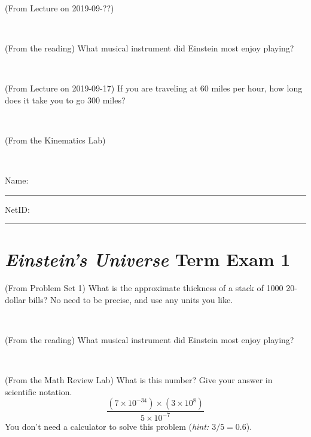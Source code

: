 \documentclass[12pt, letterpaper]{article}
\begin{document}
\vfill ~


\clearpage


\begin{problem} (From Lecture on 2019-09-??)
\end{problem}


\vfill ~

\begin{problem} (From the reading)
What musical instrument did Einstein most enjoy playing?
\end{problem}


\vfill ~

\begin{problem} (From Lecture on 2019-09-17)
If you are traveling at 60 miles per hour, how long does
it take you to go 300 miles?
\end{problem}


\vfill ~

\begin{problem} (From the Kinematics Lab)

\end{problem}


\vfill ~


\cleardoublepage



\noindent
Name: \rule[-1ex]{0.60\textwidth}{0.1pt}
NetID: \rule[-1ex]{0.20\textwidth}{0.1pt}

\section*{\textsl{Einstein's Universe} Term Exam 1}
\setcounter{problem}{1}


\begin{problem} (From Problem Set 1)
What is the approximate thickness of a stack of 1000 20-dollar bills?
No need to be precise, and use any units you like.
\end{problem}


\vfill ~

\begin{problem} (From the reading)
What musical instrument did Einstein most enjoy playing?
\end{problem}


\vfill ~

\begin{problem} (From the Math Review Lab)
What is this number? Give your answer in scientific notation.
$$
\frac{(7\times10^{-34})\times(3\times10^8)}{5\times10^{-7}}
$$
You don't need a calculator to solve this problem (\textit{hint: $3/5=0.6$}).
\end{problem}
\end{document}
